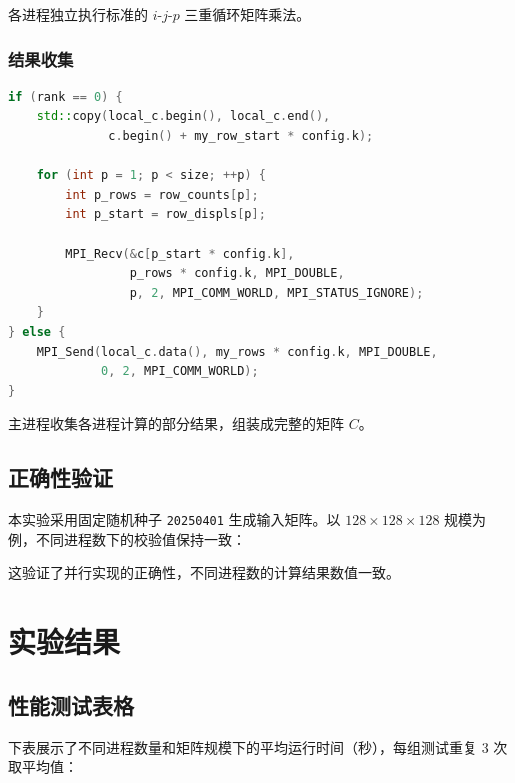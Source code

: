 \documentclass[UTF8,a4paper,12pt]{ctexart}
\begin{document}
各进程独立执行标准的 $i$-$j$-$p$ 三重循环矩阵乘法。

\subsubsection{结果收集}

\begin{lstlisting}[language=C++]
if (rank == 0) {
    std::copy(local_c.begin(), local_c.end(),
              c.begin() + my_row_start * config.k);
    
    for (int p = 1; p < size; ++p) {
        int p_rows = row_counts[p];
        int p_start = row_displs[p];
        
        MPI_Recv(&c[p_start * config.k],
                 p_rows * config.k, MPI_DOUBLE,
                 p, 2, MPI_COMM_WORLD, MPI_STATUS_IGNORE);
    }
} else {
    MPI_Send(local_c.data(), my_rows * config.k, MPI_DOUBLE,
             0, 2, MPI_COMM_WORLD);
}
\end{lstlisting}

主进程收集各进程计算的部分结果，组装成完整的矩阵 $C$。

\subsection{正确性验证}

本实验采用固定随机种子 \texttt{20250401} 生成输入矩阵。以 $128 \times 128 \times 128$ 规模为例，不同进程数下的校验值保持一致：

\begin{center}
\end{center}

这验证了并行实现的正确性，不同进程数的计算结果数值一致。

\section{实验结果}

\subsection{性能测试表格}

下表展示了不同进程数量和矩阵规模下的平均运行时间（秒），每组测试重复 3 次取平均值：
\end{document}

